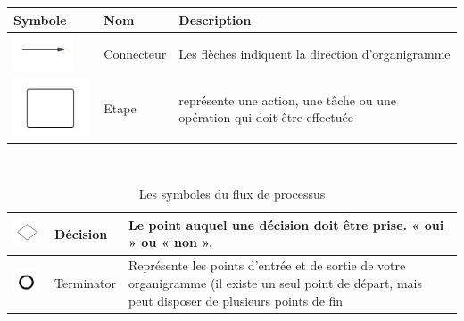 \documentclass[12pt, a4paper]{thesis}
\begin{document}
\begin{table}[!htbp]
\begin{center}
\baselineskip 20pt
\begin{tabular}{|C{4cm}|C{3cm}|C{7cm}|} 
\hline 
\textbf{Symbole} & \textbf{Nom}  & \textbf{Description}\\ 
\hline 
\includegraphics{connecteur.JPG} & Connecteur & Les flèches indiquent la direction d'organigramme \\
\hline 
\includegraphics[scale=0.7]{etape.JPG} & Etape & représente une action, une tâche ou une opération qui doit être effectuée\\
\hline 
\end{tabular} 
 \end{center}
\end{table}\\
\begin{table}[!htbp]
\begin{center}
\baselineskip 20pt
\begin{tabular}{|C{4cm}|C{3cm}|C{7cm}|}
\hline 
\includegraphics[scale=0.7]{dd.JPG} & Décision & Le point auquel une décision doit être prise. « oui » ou « non ».\\
\hline 
\includegraphics{df.JPG} & Terminator &	Représente les points d'entrée et de sortie de votre organigramme (il existe un seul point de départ, mais peut disposer de plusieurs points de fin\\
\hline 

\end{tabular} 
 \caption{Les symboles du flux de processus}
 \end{center}
\end{table}\\
\newpage
\end{document}
